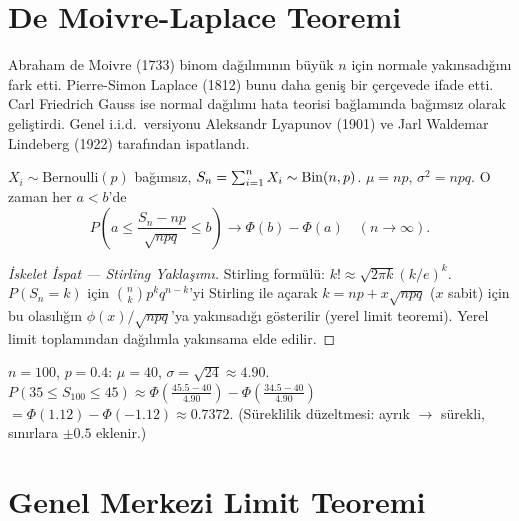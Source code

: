 \section{De Moivre-Laplace Teoremi}
\label{sec:demoivre_laplace}

\begin{tarihselnot}
Abraham de Moivre (1733) binom dağılımının büyük $n$ için normale yakınsadığını
fark etti. Pierre-Simon Laplace (1812) bunu daha geniş bir çerçevede ifade etti.
Carl Friedrich Gauss ise normal dağılımı hata teorisi bağlamında bağımsız olarak geliştirdi.
Genel i.i.d.\ versiyonu Aleksandr Lyapunov (1901) ve Jarl Waldemar Lindeberg (1922) tarafından
ispatlandı.
\end{tarihselnot}

\begin{teorem}
\label{thm:demoivre_laplace}
$X_i \sim \mathrm{Bernoulli}(p)$ bağımsız, $S_n = \sum_{i=1}^n X_i \sim \operatorname{Bin}(n,p)$.
$\mu = np$, $\sigma^2 = npq$. O zaman her $a < b$'de
\[
  P\!\left(a \leq \frac{S_n - np}{\sqrt{npq}} \leq b\right) \to \Phi(b) - \Phi(a) \quad (n\to\infty).
\]
\end{teorem}

\begin{proof}[İskelet İspat --- Stirling Yaklaşımı]
Stirling formülü: $k! \approx \sqrt{2\pi k}(k/e)^k$.
$P(S_n = k)$ için $\binom{n}{k}p^kq^{n-k}$'yi Stirling ile açarak
$k = np + x\sqrt{npq}$ ($x$ sabit) için bu olasılığın
$\phi(x)/\sqrt{npq}$'ya yakınsadığı gösterilir (yerel limit teoremi).
Yerel limit toplamından dağılımla yakınsama elde edilir.
\end{proof}

\begin{ornek}
$n = 100$, $p = 0.4$: $\mu = 40$, $\sigma = \sqrt{24} \approx 4.90$.
$P(35 \leq S_{100} \leq 45) \approx \Phi\!\left(\frac{45.5-40}{4.90}\right) - \Phi\!\left(\frac{34.5-40}{4.90}\right)$
$= \Phi(1.12) - \Phi(-1.12) \approx 0.7372$.
(Süreklilik düzeltmesi: ayrık $\to$ sürekli, sınırlara $\pm 0.5$ eklenir.)
\end{ornek}

\section{Genel Merkezi Limit Teoremi}
\label{sec:genel_mlt}

